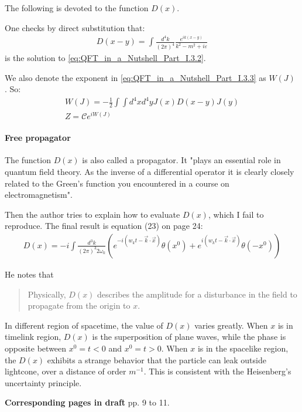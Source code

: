 \documentclass{book}
\numberwithin{equation}{subsection} %
\theoremstyle{definition}
\begin{document}
The following is devoted to the function $D(x)$.

One checks by direct substitution that:
\begin{align}
    D(x-y) = \int \frac{d^4k}{(2\pi)^4} 
        \frac{e^{ik(x-y)}}{k^2-m^2+i\varepsilon}
\end{align}
is the solution to \ref{eq:QFT_in_a_Nutshell_Part_I.3.2}.

We also denote the exponent in \ref{eq:QFT_in_a_Nutshell_Part_I.3.3}
as $W(J)$ . So:
\begin{align}
    \label{eq:}
    W(J) = -\frac{1}{2} \int\int d^4x d^4y J(x)D(x-y)J(y) \\
    Z= \mathcal{C}e^{iW(J)}
\end{align}

\paragraph{Free propagator}

The function $D(x)$ is also called a propagator. It "plays an 
essential role in quantum field theory. As the inverse of a
differential operator it is clearly closely related to the Green’s
function you encountered in a course on electromagnetism".

Then the author tries to explain how to evaluate $D(x)$, which
I fail to reproduce. The final result is equation (23) on page 
24:
\begin{align}
    D(x)= -i\int \frac{d^3k}{(2\pi)^3 2\omega_k}
    \left( e^{-i(w_k t-\vec{k}\cdot\vec{x})} \theta(x^0)
        + e^{i(w_k t-\vec{k}\cdot\vec{x})} \theta(-x^0)
    \right)
\end{align}

He notes that
\begin{quote}
    Physically, $D(x)$ describes the amplitude for a disturbance 
    in the field to propagate from the origin to $x$. 
\end{quote}
In different region of spacetime, the value of $D(x)$ varies greatly.
When $x$ is in timelink region, $D(x)$ is the superposition of
plane waves, while the phase is opposite between $x^0=t<0$ and
$x^0=t>0$. When $x$ is in the spacelike region, the $D(x)$ exhibits
a strange behavior that the particle can leak outside lightcone,
over a distance of order $m^{-1}$. This is consistent with the
Heisenberg's uncertainty principle.

\textbf{Corresponding pages in draft} pp. 9 to 11.
\end{document}
